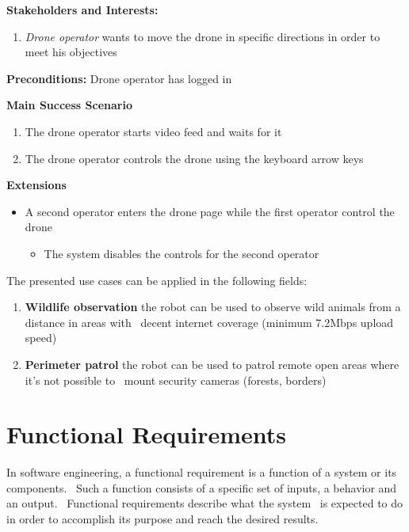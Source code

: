 \textbf{Stakeholders and Interests:}
\begin{enumerate}
    \item \textit{Drone operator} wants to move the drone in specific directions in order to meet his objectives
\end{enumerate}

\textbf{Preconditions:} Drone operator has logged in

\textbf{Main Success Scenario}
\begin{enumerate}
    \item The drone operator starts video feed and waits for it
    \item The drone operator controls the drone using the keyboard arrow keys
\end{enumerate}

\textbf{Extensions}
\begin{itemize}
    \item A second operator enters the drone page while the first operator control the drone
            \begin{itemize}
                \item The system disables the controls for the second operator
            \end{itemize}
\end{itemize}

The presented use cases can be applied in the following fields:
\begin{enumerate}
    \item \textbf{Wildlife observation} the robot can be used to observe wild animals from a distance in areas with \
        decent internet coverage (minimum 7.2Mbps upload speed) %
    \item \textbf{Perimeter patrol} the robot can be used to patrol remote open areas where it's not possible to \
        mount security cameras (forests, borders)
\end{enumerate}


\section{Functional Requirements}
\label{sec:functional-requirements}

In software engineering, a functional requirement is a function of a system or its components. \
Such a function consists of a specific set of inputs, a behavior and an output. \
Functional requirements describe what the system \
is expected to do in order to accomplish its purpose and reach the desired results.


